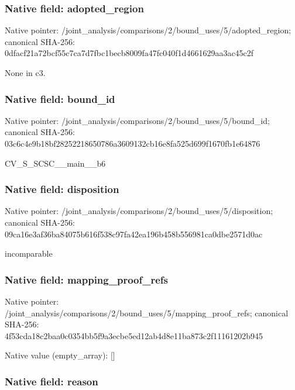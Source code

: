 \documentclass[10pt,a4paper]{article}
\begin{document}
\subsubsection{Native field: adopted\_region}


Native pointer: /joint\_analysis/comparis\allowbreak{}ons/2/bound\_uses/5/adopt\allowbreak{}ed\_region; canonical SHA-256: 0dfacf21a72bcf55c7ca7d7f\allowbreak{}bc1becb8009fa47fc040f1d4\allowbreak{}661629aa3ac45c2f


None in c3.


\subsubsection{Native field: bound\_id}


Native pointer: /joint\_analysis/comparis\allowbreak{}ons/2/bound\_uses/5/bound\allowbreak{}\_id; canonical SHA-256: 03c6c4e9b18bf28252218650\allowbreak{}786a3609132cb16e8fa525d6\allowbreak{}99f1670fb1e64876


CV\_S\_SCSC\_\_main\_\_b6


\subsubsection{Native field: disposition}


Native pointer: /joint\_analysis/comparis\allowbreak{}ons/2/bound\_uses/5/dispo\allowbreak{}sition; canonical SHA-256: 09ca16e3af36ba84075b616f\allowbreak{}538c97fa42ea196b458b5569\allowbreak{}81ca0dbe2571d0ac


incomparable


\subsubsection{Native field: mapping\_proof\_refs}


Native pointer: /joint\_analysis/comparis\allowbreak{}ons/2/bound\_uses/5/mappi\allowbreak{}ng\_proof\_refs; canonical SHA-256: 4f53cda18c2baa0c0354bb5f\allowbreak{}9a3ecbe5ed12ab4d8e11ba87\allowbreak{}3c2f11161202b945



Native value (empty\_array): []



\subsubsection{Native field: reason}
\end{document}

